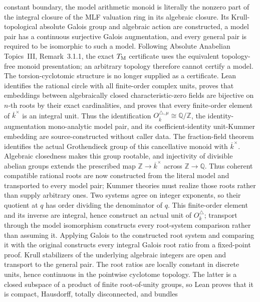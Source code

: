 \begin{definition}
  constant boundary, the model arithmetic monoid is literally the nonzero
  part of the integral closure of the MLF valuation ring in its algebraic
  closure.  Its Krull-topological absolute Galois group and algebraic action
  are constructed, a model pair has a continuous surjective Galois
  augmentation, and every general pair is required to be isomorphic to such
  a model.  Following Absolute Anabelian Topics~III, Remark~3.1.1, the exact
  \(T_{\rm M}\) certificate uses the equivalent topology-free monoid
  presentation; an arbitrary topology therefore cannot certify a model.
  The torsion-cyclotomic structure is no longer supplied as a certificate.
  Lean identifies the rational circle with all finite-order complex units,
  proves that embeddings between algebraically closed characteristic-zero
  fields are bijective on \(n\)-th roots by their exact cardinalities, and
  proves that every finite-order element of
  \(\overline{k}^{\times}\) is an integral unit.  Thus the identification
  \(O_{\overline{k}}^{\triangle,\mu}\cong\mathbb Q/\mathbb Z\), the
  identity-augmentation mono-analytic model pair, and its coefficient-identity
  unit-Kummer embedding are source-constructed without caller data.
  The fraction-field theorem identifies the actual Grothendieck group of this
  cancellative monoid with \(\overline{k}^{\times}\).  Algebraic closedness
  makes this group rootable, and injectivity of divisible abelian groups
  extends the prescribed map \(\mathbb Z\to\overline{k}^{\times}\) across
  \(\mathbb Z\to\mathbb Q\).  Thus coherent compatible rational roots are
  now constructed from the literal model and transported to every model pair;
  Kummer theories must realize those roots rather than supply arbitrary ones.
  Two systems agree on integer exponents, so their quotient at \(q\) has order
  dividing the denominator of \(q\).  This finite-order element and its inverse
  are integral, hence construct an actual unit of
  \(O_{\overline{k}}^{\triangle}\); transport through the model isomorphism
  constructs every root-system comparison rather than assuming it.
  Applying Galois to the constructed root system and comparing it with the
  original constructs every integral Galois root ratio from a fixed-point
  proof.  Krull stabilizers of the underlying algebraic integers are open and
  transport to the general pair.  The root ratios are locally constant in
  discrete units, hence continuous in the pointwise cyclotome topology.  The
  latter is a closed subspace of a product of finite root-of-unity groups, so
  Lean proves that it is compact, Hausdorff, totally disconnected, and bundles

\end{definition}
